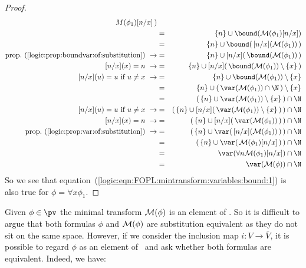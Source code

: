 \begin{proof}
\begin{eqnarray*}
{    M}(\phi_{1})[n/x]\,)\\
    &=&\{n\}\cup\bound({\cal M}(\phi_{1})[n/x])\\
    &=&\{n\}\cup\bound(\,[n/x]({\cal M}(\phi_{1}))\,)\\
    \mbox{prop.~(\ref{logic:prop:boundvar:of:substitution})}\ \rightarrow
    &=&\{n\}\cup[n/x](\,\bound({\cal M}(\phi_{1}))\,)\\
    \mbox{$[n/x](x)=n$}\ \rightarrow
    &=&\{n\}\cup[n/x](\,\bound({\cal
    M}(\phi_{1}))\setminus\{x\}\,)\\
    \mbox{$[n/x](u)=u$ if $u\neq x$}\ \rightarrow
    &=&\{n\}\cup\bound({\cal M}(\phi_{1}))\setminus\{x\}\\
    &=&\{n\}\cup(\,\var({\cal M}(\phi_{1}))\cap\N\,)\setminus\{x\}\\
    &=&(\,\{n\}\cup\var({\cal M}(\phi_{1}))\setminus\{x\}\,)\cap\N\\
    \mbox{$[n/x](u)=u$ if $u\neq x$}\ \rightarrow
    &=&(\,\{n\}\cup[n/x](\,\var({\cal
    M}(\phi_{1}))\setminus\{x\}\,)\,)\cap\N\\
    \mbox{$[n/x](x)=n$}\ \rightarrow
    &=&(\,\{n\}\cup[n/x](\,\var({\cal M}(\phi_{1}))\,)\,)\cap\N\\
    \mbox{prop.~(\ref{logic:prop:var:of:substitution})}\ \rightarrow
    &=&(\,\{n\}\cup\var(\,[n/x]({\cal M}(\phi_{1}))\,)\,)\cap\N\\
    &=&(\,\{n\}\cup\var(\,{\cal M}(\phi_{1})[n/x]\,)\,)\cap\N\\
    &=&\var(\forall n{\cal M}(\phi_{1})[n/x])\cap\N\\
    &=&\var({\cal M}(\phi))\cap\N
    \end{eqnarray*}
So we see that
equation~(\ref{logic:eqn:FOPL:mintransform:variables:bound:1}) is
also true for $\phi=\forall x\phi_{1}$.
\end{proof}

Given $\phi\in\pv$ the minimal transform ${\cal M}(\phi)$ is an
element of \pvb. So it is difficult to argue that both formulas
$\phi$ and ${\cal M}(\phi)$ are substitution equivalent as they do
not sit on the same space. However, if we consider the inclusion map
$i:V\to\bar{V}$, it is possible to regard $\phi$ as an element of
\pvb\ and ask whether both formulas are equivalent. Indeed, we have:

